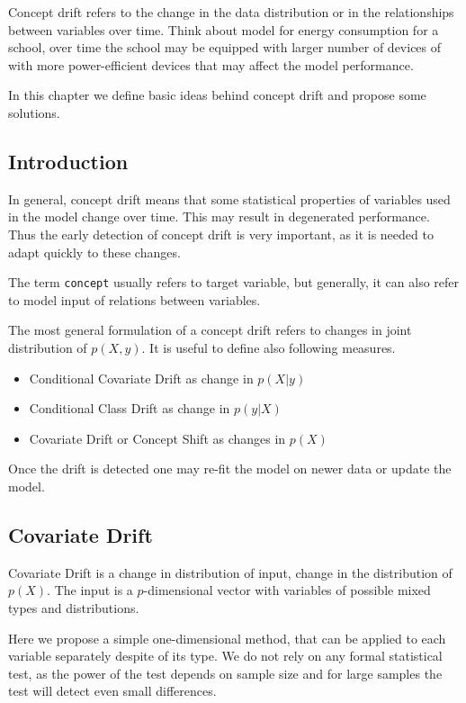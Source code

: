 \documentclass[]{krantz}
\providecommand{\tightlist}{%
  \setlength{\itemsep}{0pt}\setlength{\parskip}{0pt}}
\theoremstyle{definition}
\theoremstyle{definition}
\theoremstyle{definition}
\theoremstyle{remark}
\begin{document}
Concept drift refers to the change in the data distribution or in the
relationships between variables over time. Think about model for energy
consumption for a school, over time the school may be equipped with
larger number of devices of with more power-efficient devices that may
affect the model performance.

In this chapter we define basic ideas behind concept drift and propose
some solutions.

\hypertarget{introduction-4}{%
\subsection{Introduction}\label{introduction-4}}

In general, concept drift means that some statistical properties of
variables used in the model change over time. This may result in
degenerated performance. Thus the early detection of concept drift is
very important, as it is needed to adapt quickly to these changes.

The term \texttt{concept} usually refers to target variable, but
generally, it can also refer to model input of relations between
variables.

The most general formulation of a concept drift refers to changes in
joint distribution of \(p(X, y)\). It is useful to define also following
measures.

\begin{itemize}
\tightlist
\item
  Conditional Covariate Drift as change in \(p(X | y)\)
\item
  Conditional Class Drift as change in \(p(y | X)\)
\item
  Covariate Drift or Concept Shift as changes in \(p(X)\)
\end{itemize}

Once the drift is detected one may re-fit the model on newer data or
update the model.

\hypertarget{covariate-drift}{%
\subsection{Covariate Drift}\label{covariate-drift}}

Covariate Drift is a change in distribution of input, change in the
distribution of \(p(X)\). The input is a \(p\)-dimensional vector with
variables of possible mixed types and distributions.

Here we propose a simple one-dimensional method, that can be applied to
each variable separately despite of its type. We do not rely on any
formal statistical test, as the power of the test depends on sample size
and for large samples the test will detect even small differences.
\end{document}
